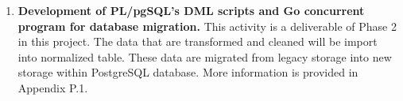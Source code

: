 \begin{enumerate}[topsep=0pt,itemsep=-1ex,partopsep=1ex,parsep=1.5ex]
	\item \textbf{Development of PL/pgSQL's DML scripts and Go concurrent program for database migration.}
	This activity is a deliverable of Phase 2 in this project. The data that are transformed and cleaned will be import into normalized table. These data are migrated from legacy storage into new storage within PostgreSQL database. More information is provided in Appendix P.1.
	
\end{enumerate}

